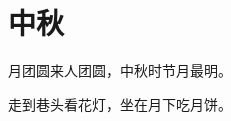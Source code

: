 \documentclass[12pt,UTF-8,openany]{ctexbook}
\begin{document}
\clearpage

\begin{center}
    
\end{center}


\hanzibox{}\hanzibox{}\hanzibox{}\hanzibox{}\hspace{1em}\hanzibox{}\hanzibox{}\hanzibox{}\hanzibox{}

\hanzibox{}\hanzibox{}\hanzibox{}\hanzibox{}\hspace{1em}\hanzibox{}\hanzibox{}\hanzibox{}\hanzibox{}

\hanzibox{}\hanzibox{}\hanzibox{}\hanzibox{}\hspace{1em}\hanzibox{}\hanzibox{}\hanzibox{}\hanzibox{}

\hanzibox{}\hanzibox{}\hanzibox{}\hanzibox{}\hspace{1em}\hanzibox{}\hanzibox{}\hanzibox{}\hanzibox{}






\chapter{中秋}

\begin{large}
    
    月团圆来人团圆，中秋时节月最明。
    
    走到巷头看花灯，坐在月下吃月饼。
    
\end{large}


\clearpage

\begin{center}
    
\end{center}


\hanzibox{}\hanzibox{}\hanzibox{}\hanzibox{}\hspace{1em}\hanzibox{}\hanzibox{}\hanzibox{}\hanzibox{}

\hanzibox{}\hanzibox{}\hanzibox{}\hanzibox{}\hspace{1em}\hanzibox{}\hanzibox{}\hanzibox{}\hanzibox{}
\end{document}
